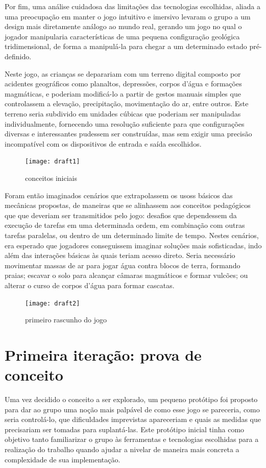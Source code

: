 Por fim, uma análise cuidadosa das limitações das tecnologias escolhidas, aliada a uma preocupação em manter o jogo intuitivo e imersivo levaram o grupo a um design mais diretamente análogo ao mundo real, gerando um jogo no qual o jogador manipularia características de uma pequena configuração geológica tridimensional, de forma a manipulá-la para chegar a um determinado estado pré-definido.

Neste jogo, as crianças se deparariam com um terreno digital composto por acidentes geográficos como planaltos, depressões, corpos d'água e formações magmáticas, e poderiam modificá-lo a partir de gestos manuais simples que controlassem a elevação, precipitação, movimentação do ar, entre outros. Este terreno seria subdivido em unidades cúbicas que poderiam ser manipuladas individualmente, fornecendo uma resolução suficiente para que configurações diversas e interessantes pudessem ser construídas, mas sem exigir uma precisão incompatível com os dispositivos de entrada e saída escolhidos.

\begin{figure}[h]
	\centering
	\texttt{[image: draft1]}
	\caption{conceitos iniciais}
\end{figure}


Foram então imaginados cenários que extrapolassem os usoss básicos das mecânicas propostas, de maneiras que se alinhassem aos conceitos pedagógicos que que deveriam ser transmitidos pelo jogo: desafios que dependessem da execução de tarefas em uma determinada ordem, em combinação com outras tarefas paralelas, ou dentro de um determinado limite de tempo. Nestes cenários, era esperado que jogadores conseguissem imaginar soluções mais sofisticadas, indo além das interações básicas às quais teriam acesso direto. Seria necessário movimentar massas de ar para jogar água contra blocos de terra, formando praias; escavar o solo para alcançar câmaras magmáticos e formar vulcões; ou alterar o curso de corpos d'água para formar cascatas.

\begin{figure}[h]
	\centering
	\texttt{[image: draft2]}
	\caption{primeiro rascunho do jogo}
\end{figure}

\section{Primeira iteração: prova de conceito}\label{sec-primeira-iteracao-prova-conceito}

Uma vez decidido o conceito a ser explorado, um pequeno protótipo foi proposto para dar ao grupo uma noção mais palpável de como esse jogo se pareceria, como seria controlá-lo, que dificuldades imprevistas apareceriam e quais as medidas que precisariam ser tomadas para suplantá-las. Este protótipo inicial tinha como objetivo tanto familiarizar o grupo às ferramentas e tecnologias escolhidas para a realização do trabalho quando ajudar a nivelar de maneira mais concreta a complexidade de sua implementação.


